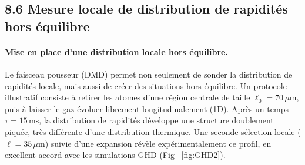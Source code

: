 \subsection*{8.6 Mesure locale de distribution de rapidités hors équilibre}

\paragraph{Mise en place d’une distribution locale hors équilibre.}  
Le faisceau pousseur (\gls{DMD}) permet non seulement de sonder la distribution de rapidités locale, mais aussi de créer des situations hors équilibre. Un protocole illustratif consiste à retirer les atomes d’une région centrale de taille $\ell_0 = 70\,\mu$m, puis à laisser le gaz évoluer librement longitudinalement (1D). Après un temps $\tau = 15$\,ms, la distribution de rapidités développe une structure doublement piquée, très différente d’une distribution thermique. Une seconde sélection locale ($\ell=35\,\mu$m) suivie d’une expansion révèle expérimentalement ce profil, en excellent accord avec les simulations \gls{GHD} (Fig ~\ref{fig:GHD2}).

